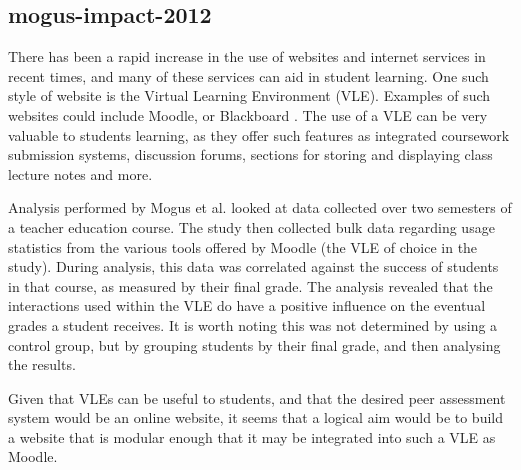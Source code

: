 \documentclass[a4paper,11pt]{report}
\begin{document}
\subsection{mogus-impact-2012}
There has been a rapid increase in the use of websites and internet services in recent times, and many of these services can aid in student learning. One such style of website is the Virtual Learning Environment (VLE). Examples of such websites could include Moodle, \cite{moodle_about_2016} or Blackboard \cite{blackboard_blackboard_2016}. The use of a VLE can be very valuable to students learning, as they offer such features as integrated coursework submission systems, discussion forums, sections for storing and displaying class lecture notes and more.\par
Analysis performed by Mogus et al. \cite{mogus_impact_2012} looked at data collected over two semesters of a teacher education course. The study then collected bulk data regarding usage statistics from the various tools offered by Moodle (the VLE of choice in the study). During analysis, this data was correlated against the success of students in that course, as measured by their final grade. The analysis 
revealed that the interactions used within the VLE do have a positive influence on the eventual grades a student receives. It is worth noting this was not determined by using a control group, but by grouping students by their final grade, and then analysing the results.\par
Given that VLEs can be useful to students, and that the desired peer assessment system would be an online website, it seems that a logical aim would be to build a website that is modular enough that it may be integrated into such a VLE as Moodle.
\end{document}
